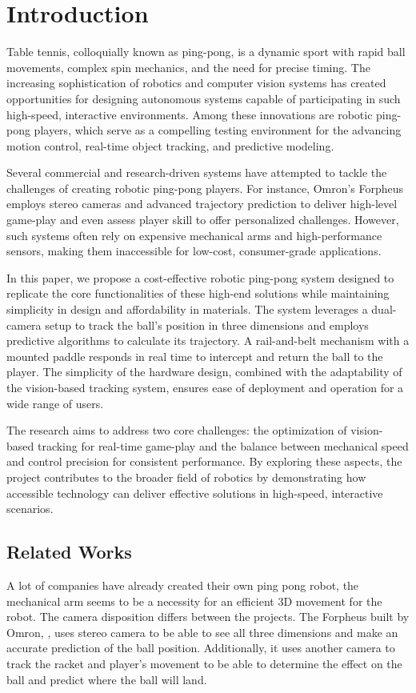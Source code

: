 \chapter{Introduction}

Table tennis, colloquially known as ping-pong, is a dynamic sport with rapid ball movements, complex spin mechanics, and the need for precise timing. The increasing sophistication of robotics and computer vision systems has created opportunities for designing autonomous systems capable of participating in such high-speed, interactive environments. Among these innovations are robotic ping-pong players, which serve as a compelling testing environment for the advancing motion control, real-time object tracking, and predictive modeling.

Several commercial and research-driven systems have attempted to tackle the challenges of creating robotic ping-pong players. For instance, Omron's Forpheus employs stereo cameras and advanced trajectory prediction to deliver high-level game-play and even assess player skill to offer personalized challenges.\cite{Kyohei2019} However, such systems often rely on expensive mechanical arms and high-performance sensors, making them inaccessible for low-cost, consumer-grade applications.

In this paper, we propose a cost-effective robotic ping-pong system designed to replicate the core functionalities of these high-end solutions while maintaining simplicity in design and affordability in materials. The system leverages a dual-camera setup to track the ball's position in three dimensions and employs predictive algorithms to calculate its trajectory. A rail-and-belt mechanism with a mounted paddle responds in real time to intercept and return the ball to the player. The simplicity of the hardware design, combined with the adaptability of the vision-based tracking system, ensures ease of deployment and operation for a wide range of users.

The research aims to address two core challenges: the optimization of vision-based tracking for real-time game-play and the balance between mechanical speed and control precision for consistent performance. By exploring these aspects, the project contributes to the broader field of robotics by demonstrating how accessible technology can deliver effective solutions in high-speed, interactive scenarios.

\section{Related Works}
A lot of companies have already created their own ping pong robot, the mechanical arm seems to be a necessity for an efficient 3D movement for the robot. The camera disposition differs between the projects. The Forpheus built by Omron, \cite{Kyohei2019}, uses stereo camera to be able to see all three dimensions and make an accurate prediction of the ball position. Additionally, it uses another camera to track the racket and player's movement to be able to determine the effect on the ball and predict where the ball will land.

